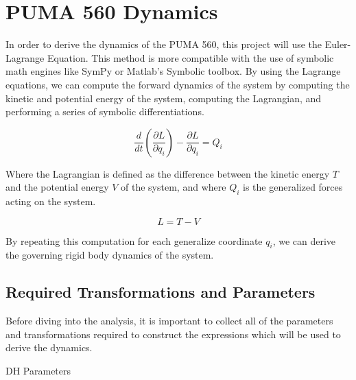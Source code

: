 \section*{PUMA 560 Dynamics}

In order to derive the dynamics of the PUMA 560, this project will use the Euler-Lagrange Equation. This method is more compatible with the use of symbolic math engines like SymPy or Matlab's Symbolic toolbox. By using the Lagrange equations, we can compute the forward dynamics of the system by computing the kinetic and potential energy of the system, computing the Lagrangian, and performing a series of symbolic differentiations.

$$
\frac{d}{d t}\left(\frac{\partial L}{\partial q_{i}}\right)-\frac{\partial L}{\partial q_{i}}=Q_{i}
$$

\noindent Where the Lagrangian is defined as the difference between the kinetic energy $T$ and the potential energy $V$ of the system, and where $Q_i$ is the generalized forces acting on the system.

$$
L = T-V
$$

\noindent By repeating this computation for each generalize coordinate $q_i$, we can derive the governing rigid body dynamics of the system.



\subsection*{Required Transformations and Parameters}

Before diving into the analysis, it is important to collect all of the parameters and transformations required to construct the expressions which will be used to derive the dynamics.

DH Parameters

